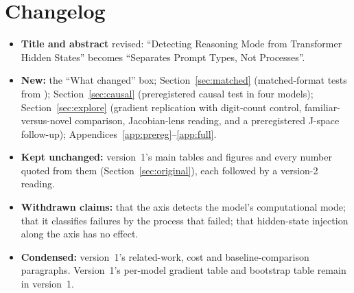 \documentclass[11pt]{article}
\begin{document}
\section{Changelog}\label{app:changelog}
\begin{itemize}
  \item \textbf{Title and abstract} revised: ``Detecting Reasoning Mode from Transformer Hidden States'' becomes ``Separates Prompt Types, Not Processes''.
  \item \textbf{New:} the ``What changed'' box; Section~\ref{sec:matched} (matched-format tests from \citealp{ramdan2026fingerprint}); Section~\ref{sec:causal} (preregistered causal test in four models); Section~\ref{sec:explore} (gradient replication with digit-count control, familiar-versus-novel comparison, Jacobian-lens reading, and a preregistered J-space follow-up); Appendices~\ref{app:prereg}--\ref{app:full}.
  \item \textbf{Kept unchanged:} version~1's main tables and figures and every number quoted from them (Section~\ref{sec:original}), each followed by a version-2 reading.
  \item \textbf{Withdrawn claims:} that the axis detects the model's computational mode; that it classifies failures by the process that failed; that hidden-state injection along the axis has no effect.
  \item \textbf{Condensed:} version~1's related-work, cost and baseline-comparison paragraphs. Version~1's per-model gradient table and bootstrap table remain in version~1.
\end{itemize}
\end{document}
